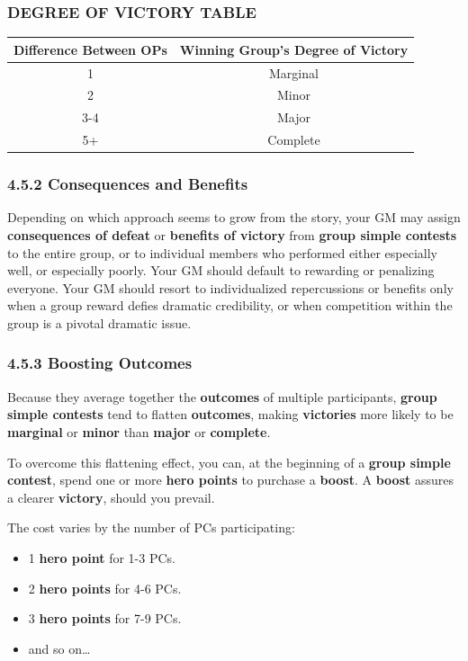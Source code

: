 \documentclass[
]{article}
\providecommand{\tightlist}{%
  \setlength{\itemsep}{0pt}\setlength{\parskip}{0pt}}
\begin{document}
\hypertarget{degree-of-victory-table}{%
\subsubsection{DEGREE OF VICTORY TABLE}\label{degree-of-victory-table}}

\begin{longtable}[]{@{}cc@{}}
\toprule
Difference Between OPs & Winning Group's Degree of
Victory\tabularnewline
\midrule
\endhead
1 & Marginal\tabularnewline
2 & Minor\tabularnewline
3-4 & Major\tabularnewline
5+ & Complete\tabularnewline
\bottomrule
\end{longtable}

\hypertarget{consequences-and-benefits}{%
\subsubsection{4.5.2 Consequences and
Benefits}\label{consequences-and-benefits}}

Depending on which approach seems to grow from the story, your GM may
assign \textbf{consequences of defeat} or \textbf{benefits of victory}
from \textbf{group simple contests} to the entire group, or to
individual members who performed either especially well, or especially
poorly. Your GM should default to rewarding or penalizing everyone. Your
GM should resort to individualized repercussions or benefits only when a
group reward defies dramatic credibility, or when competition within the
group is a pivotal dramatic issue.

\hypertarget{boosting-outcomes}{%
\subsubsection{4.5.3 Boosting Outcomes}\label{boosting-outcomes}}

Because they average together the \textbf{outcomes} of multiple
participants, \textbf{group simple contests} tend to flatten
\textbf{outcomes}, making \textbf{victories} more likely to be
\textbf{marginal} or \textbf{minor} than \textbf{major} or
\textbf{complete}.

To overcome this flattening effect, you can, at the beginning of a
\textbf{group simple contest}, spend one or more \textbf{hero points} to
purchase a \textbf{boost}. A \textbf{boost} assures a clearer
\textbf{victory}, should you prevail.

The cost varies by the number of PCs participating:

\begin{itemize}
\tightlist
\item
  1 \textbf{hero point} for 1-3 PCs.
\item
  2 \textbf{hero points} for 4-6 PCs.
\item
  3 \textbf{hero points} for 7-9 PCs.\\
\item
  and so on\ldots{}
\end{itemize}
\end{document}
